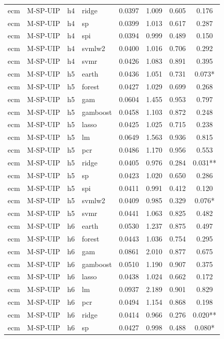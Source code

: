 \begin{ThreePartTable}
\begin{longtable}[t]{llclcccc}
ecm & M-SP-UIP & h4 & ridge & 0.0397 & 1.009 & 0.605 & 0.176\\
ecm & M-SP-UIP & h4 & sp & 0.0399 & 1.013 & 0.617 & 0.287\\
ecm & M-SP-UIP & h4 & spi & 0.0394 & 0.999 & 0.489 & 0.150\\
ecm & M-SP-UIP & h4 & svmlw2 & 0.0400 & 1.016 & 0.706 & 0.292\\
ecm & M-SP-UIP & h4 & svmr & 0.0426 & 1.083 & 0.891 & 0.395\\
\addlinespace
ecm & M-SP-UIP & h5 & earth & 0.0436 & 1.051 & 0.731 & 0.073*\\
ecm & M-SP-UIP & h5 & forest & 0.0427 & 1.029 & 0.699 & 0.268\\
ecm & M-SP-UIP & h5 & gam & 0.0604 & 1.455 & 0.953 & 0.797\\
ecm & M-SP-UIP & h5 & gamboost & 0.0458 & 1.103 & 0.872 & 0.248\\
ecm & M-SP-UIP & h5 & lasso & 0.0425 & 1.025 & 0.715 & 0.238\\
ecm & M-SP-UIP & h5 & lm & 0.0649 & 1.563 & 0.936 & 0.815\\
ecm & M-SP-UIP & h5 & pcr & 0.0486 & 1.170 & 0.956 & 0.553\\
ecm & M-SP-UIP & h5 & ridge & 0.0405 & 0.976 & 0.284 & 0.031**\\
ecm & M-SP-UIP & h5 & sp & 0.0423 & 1.020 & 0.650 & 0.286\\
ecm & M-SP-UIP & h5 & spi & 0.0411 & 0.991 & 0.412 & 0.120\\
ecm & M-SP-UIP & h5 & svmlw2 & 0.0409 & 0.985 & 0.329 & 0.076*\\
ecm & M-SP-UIP & h5 & svmr & 0.0441 & 1.063 & 0.825 & 0.482\\
\addlinespace
ecm & M-SP-UIP & h6 & earth & 0.0530 & 1.237 & 0.875 & 0.497\\
ecm & M-SP-UIP & h6 & forest & 0.0443 & 1.036 & 0.754 & 0.295\\
ecm & M-SP-UIP & h6 & gam & 0.0861 & 2.010 & 0.877 & 0.675\\
ecm & M-SP-UIP & h6 & gamboost & 0.0510 & 1.190 & 0.907 & 0.375\\
ecm & M-SP-UIP & h6 & lasso & 0.0438 & 1.024 & 0.662 & 0.172\\
ecm & M-SP-UIP & h6 & lm & 0.0937 & 2.189 & 0.901 & 0.829\\
ecm & M-SP-UIP & h6 & pcr & 0.0494 & 1.154 & 0.868 & 0.198\\
ecm & M-SP-UIP & h6 & ridge & 0.0414 & 0.966 & 0.276 & 0.020**\\
ecm & M-SP-UIP & h6 & sp & 0.0427 & 0.998 & 0.488 & 0.080*\\

\end{longtable}
\end{ThreePartTable}
